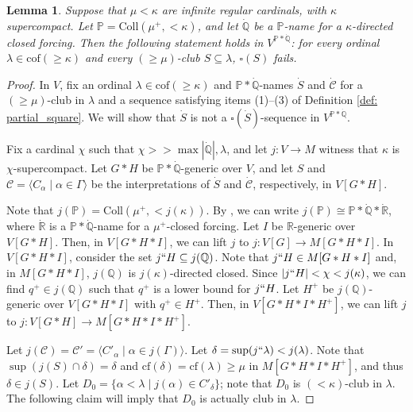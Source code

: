 \documentclass{amsart}
\numberwithin{theorem}{section}
\newtheorem{lemma}[theorem]{Lemma}
\theoremstyle{definition}
\newcommand{\cf}{\mathrm{cf}}
\newcommand{\bb}{\mathbb}
\newcommand{\mc}{\mathcal}
\newcommand{\ra}{\rightarrow}
\newcommand{\Q}{\bb{Q}}
\renewcommand{\P}{\bb{P}}
\begin{document}
\begin{lemma} \label{lemma: 1_collapse}
  Suppose that $\mu < \kappa$ are infinite regular cardinals, with $\kappa$ 
  supercompact. Let $\P = \mathrm{Coll}(\mu^+, {<}\kappa)$, and let $\dot{\Q}$ be 
  a $\P$-name for a $\kappa$-directed closed forcing. Then the following statement holds in 
  $V^{\P \ast \dot{\Q}}$: for every ordinal $\lambda \in \mathrm{cof}({\geq}\kappa)$ and every 
  $({\geq }\mu)$-club $S \subseteq \lambda$, $\square(S)$ fails.
\end{lemma}

\begin{proof}
  In $V$, fix an ordinal $\lambda \in \mathrm{cof}({\geq}\kappa)$ and $\P \ast \dot{\Q}$-names
  $\dot{S}$ and $\dot{\mc{C}}$ for a $({\geq} \mu)$-club in $\lambda$ and a sequence 
  satisfying items (1)--(3) of Definition \ref{def: partial_square}. We will show that 
  $\dot{S}$ is not a $\square(\dot{S})$-sequence in $V^{\P \ast \dot{\Q}}$.
  
  Fix a cardinal $\chi$ such that $\chi >> \max{|\dot{\Q}|, \lambda}$, and let $j:V \ra M$ witness that 
  $\kappa$ is $\chi$-supercompact. Let $G \ast H$ be $\P \ast \dot{\Q}$-generic over $V$, and let 
  $S$ and $\mc{C} = \langle C_\alpha \mid \alpha \in \Gamma \rangle$ be the interpretations of 
  $\dot{S}$ and $\dot{\mc{C}}$, respectively, in $V[G \ast H]$.
  
  Note that $j(\P) = \mathrm{Coll}(\mu^+, {<}j(\kappa))$. By 
  \cite[Lemma 3]{magidor_reflecting}, we can write 
  $j(\P) \cong \P \ast \dot{\Q} \ast \dot{\bb{R}}$, where $\dot{\bb{R}}$ is a 
  $\P \ast \dot{\Q}$-name for a $\mu^+$-closed forcing. Let $I$ be $\bb{R}$-generic 
  over $V[G \ast H]$. Then, in $V[G \ast H \ast I]$, we can lift $j$ to 
  $j:V[G] \ra M[G \ast H \ast I]$. In $V[G \ast H \ast I]$, consider the set 
  $j``H \subseteq j(\Q)$. Note that $j``H \in M[G \ast H \ast I]$ and, in 
  $M[G \ast H \ast I]$, $j(\Q)$ is $j(\kappa)$-directed closed. Since 
  $|j``H| < \chi < j(\kappa)$, we can find $q^+ \in j(\Q)$ such that 
  $q^+$ is a lower bound for $j``H$. Let $H^+$ be $j(\Q)$-generic over 
  $V[G \ast H \ast I]$ with $q^+ \in H^+$. Then, in 
  $V[G \ast H \ast I \ast H^+]$, we can lift $j$ to $j:V[G \ast H] \ra 
  M[G \ast H \ast I \ast H^+]$.
  
  Let $j(\mc{C}) = \mc{C'} = \langle C'_\alpha \mid \alpha \in j(\Gamma) \rangle$. 
  Let $\delta = \sup(j``\lambda) < j(\lambda)$. Note that $\sup(j(S) \cap \delta) = 
  \delta$ and $\cf(\delta) = \cf(\lambda) \geq \mu$ in $M[G \ast H \ast I \ast H^+]$, and 
  thus $\delta \in j(S)$. Let $D_0 = \{\alpha < \lambda \mid j(\alpha) \in 
  C'_\delta\}$; note that $D_0$ is $({<}\kappa)$-club in $\lambda$. The following claim will 
  imply that $D_0$ is actually club in $\lambda$.
  

\end{proof}
\end{document}
